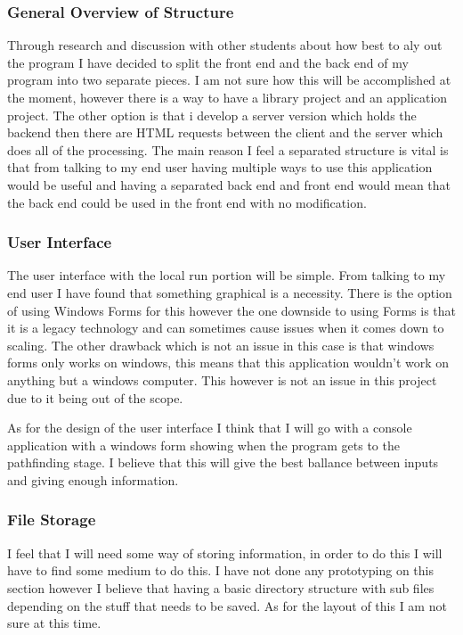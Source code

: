 \begin{FlushLeft}
            \subsubsection{General Overview of Structure}
            Through research and discussion with other students about how best to aly out the program I have decided to split the front end and the back end of my program into two separate pieces. I am not sure how this will be accomplished at the moment, however there is a way to have a library project and an application project. The other option is that i develop a server version which holds the backend then there are HTML requests between the client and the server which does all of the processing. The main reason I feel a separated structure is vital is that from talking to my end user having multiple ways to use this application would be useful and having a separated back end and front end would mean that the back end could be used in the front end with no modification. 
            \BK

            \subsubsection{User Interface}
            The user interface with the local run portion will be simple. From talking to my end user I have found that something graphical is a necessity. There is the option of using Windows Forms for this however the one downside to using Forms is that it is a legacy technology and can sometimes cause issues when it comes down to scaling. The other drawback which is not an issue in this case is that windows forms only works on windows, this means that this application wouldn't work on anything but a windows computer. This however is not an issue in this project due to it being out of the scope.\\ \bk

            As for the design of the user interface I think that I will go with a console application with a windows form showing when the program gets to the pathfinding stage. I believe that this will give the best ballance between inputs and giving enough information.\\
            \BK

            \subsubsection{File Storage}
            I feel that I will need some way of storing information, in order to do this I will have to find some medium to do this. I have not done any prototyping on this section however I believe that having a basic directory structure with sub files depending on the stuff that needs to be saved. As for the layout of this I am not sure at this time. \\ \bk


\end{FlushLeft}
